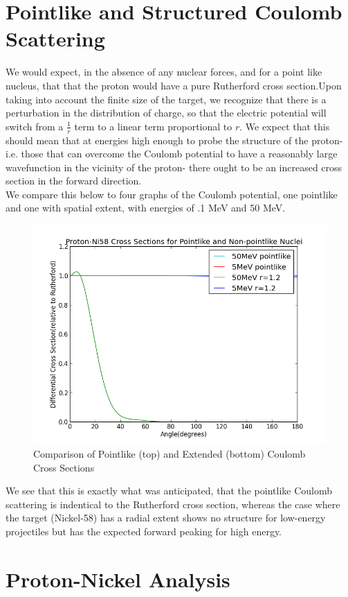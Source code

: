 \documentclass[paper=a4, fontsize=11pt]{scrartcl} %
\numberwithin{equation}{section} %
\numberwithin{figure}{section} %
\numberwithin{table}{section} %
\begin{document}
\section{Pointlike and Structured Coulomb Scattering}

We would expect, in the absence of any nuclear forces, and for a point like nucleus, that that the proton would have a pure Rutherford cross section.Upon taking into account the finite size of the target, we recognize that there is a perturbation in the distribution of charge, so that the electric potential will switch from a $\frac{1}{r}$ term to a linear term proportional to $r$. We expect that this should mean that at energies high enough to probe the structure of the proton-i.e. those that can overcome the Coulomb potential to have a reasonably large wavefunction in the vicinity of the proton- there ought to be an increased cross section in the forward direction. \\

We compare this below to four graphs of the Coulomb potential, one pointlike and one with spatial extent, with energies of .1 MeV and 50 MeV.\\

 \begin{figure}[hbt]
        \centering
        \includegraphics[width=.6\textwidth]{Pointcompare}
        \caption{Comparison of Pointlike (top) and Extended (bottom) Coulomb Cross Sections }
\end{figure}

We see that this is exactly what was anticipated, that the pointlike Coulomb scattering is indentical to the Rutherford cross section, whereas the case where the target (Nickel-58) has a radial extent shows no structure for low-energy projectiles but has the expected forward peaking for high energy. \\

\section{Proton-Nickel Analysis}
\end{document}
